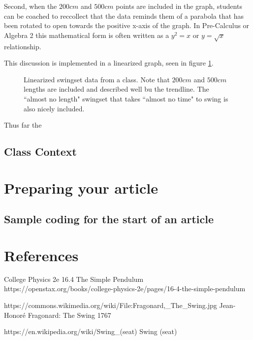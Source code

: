 \documentclass[12pt]{iopart}
\begin{document}
Second, when the $200cm$ and $500cm$ points are included in the graph, students can be coached to reccollect that the data reminds them of a parabola that has been rotated to open towards the positive x-axis of the graph.  In Pre-Calculus or Algebra 2 this mathematical form is often written as a $y^2=x$ or $y=\sqrt{x}$ relationship.  

This discussion is implemented in a linearized graph, seen in figure \ref{linearized_swingtime_graph}. 

\begin{figure}[h]
\centering
\caption{
	Linearized swingset data from a class.  Note that $200cm$ and $500cm$ lengths are included and described well bu the trendline.  The ``almost no length" swingset that takes ``almost no time" to swing is also nicely included.   
	}
	\label{linearized_swingtime_graph}
\end{figure}


Thus far the 

\subsection{Class Context}

\section{Preparing your article}

\subsection{Sample coding for the start of an article}
  

\clearpage
\section*{References}
\begin{thebibliography}{99}

College Physics 2e
16.4 The Simple Pendulum
https://openstax.org/books/college-physics-2e/pages/16-4-the-simple-pendulum

	https://commons.wikimedia.org/wiki/File:Fragonard,\_The\_Swing.jpg
	Jean-Honoré Fragonard: The Swing 
	1767

	https://en.wikipedia.org/wiki/Swing\_(seat)
		Swing (seat)

\end{thebibliography}
\end{document}
